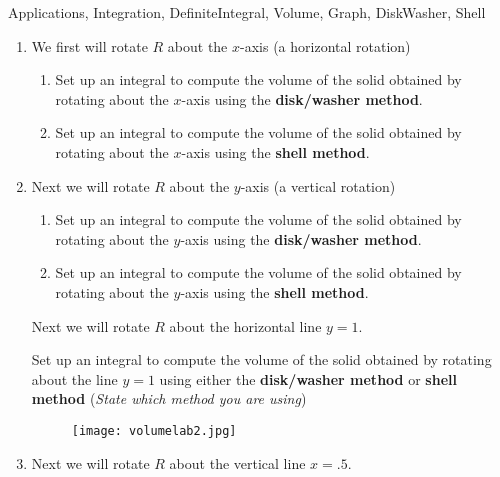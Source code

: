 \begin{tagblock}{Applications, Integration, DefiniteIntegral, Volume, Graph, DiskWasher, Shell}
\begin{question}
\begin{enumerate}
\begin{enumerate}
\item  We first will rotate $R$ about the $x$-axis (a horizontal rotation)

\begin{enumerate}
\item Set up an integral to compute the volume of the solid obtained by rotating about the $x$-axis using the \textbf{disk/washer method}.
\vspace{1in}
\item Set up an integral to compute the volume of the solid obtained by rotating about the $x$-axis using the \textbf{shell method}.
\vspace{.8in}
\end{enumerate}

\item  Next we will rotate $R$ about the $y$-axis (a vertical rotation)

\begin{enumerate}
\item Set up an integral to compute the volume of the solid obtained by rotating about the $y$-axis using the \textbf{disk/washer method}.
\vspace{1in}
\item Set up an integral to compute the volume of the solid obtained by rotating about the $y$-axis using the \textbf{shell method}.
\vspace{.8in}
\end{enumerate}

\bigskip


Next we will  rotate $R$ about the horizontal line $y=1$. 

 Set up an integral to compute the volume of the solid obtained by rotating about the line $y=1$ using either the \textbf{disk/washer method} or  \textbf{shell method} (\emph{State which method you are using})
\begin{figure}[h]
\texttt{[image: volumelab2.jpg]}
\end{figure}

\vspace{.8in}

\item Next we will rotate $R$ about the vertical line $x=.5$. 


\end{enumerate}
\end{enumerate}
\end{question}
\end{tagblock}

